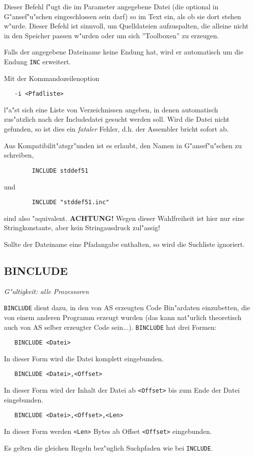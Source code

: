 \documentclass[12pt,a4paper,twoside]{report}
\makeatletter
\newcommand{\ii}[1]{{\it #1}}
\newcommand{\bb}[1]{{\bf #1}}
\newcommand{\tty}[1]{{\tt #1}}
\newcommand{\ttindex}[1]{\index{#1@{\tt #1}}}
\makeatother
\begin{document}
Dieser Befehl f"ugt die im Parameter angegebene Datei (die optional in
G"an\-se\-f"u"s\-chen eingeschlossen sein darf) so im Text ein, als ob sie dort
stehen w"urde.  Dieser Befehl ist sinnvoll, um Quelldateien aufzuspalten,
die alleine nicht in den Speicher passen w"urden oder um sich ''Toolboxen''
zu erzeugen.
\par
Falls der angegebene Dateiname keine Endung hat, wird er automatisch
um die Endung \tty{INC} erweitert.
\par
Mit der Kommandozeilenoption
\begin{verbatim}
   -i <Pfadliste>
\end{verbatim}
l"a"st sich eine Liste von Verzeichnissen angeben, in denen automatisch
zus"atzlich nach der Includedatei gesucht werden soll.  Wird die Datei
nicht gefunden, so ist dies ein \ii{fataler} Fehler, d.h. der Assembler
bricht sofort ab.
\par
Aus Kompatibilit"atsgr"unden ist es erlaubt, den Namen in G"ansef"u"schen
zu schreiben,
\begin{verbatim}
        INCLUDE stddef51
\end{verbatim}
und
\begin{verbatim}
        INCLUDE "stddef51.inc"
\end{verbatim}
sind also "aquivalent.  \bb{ACHTUNG!} Wegen dieser Wahlfreiheit ist
hier nur eine Stringkonstante, aber kein Stringausdruck zul"assig!
\par
Sollte der Dateiname eine Pfadangabe enthalten, so wird die Suchliste
ignoriert.


\subsection{BINCLUDE}
\ttindex{BINCLUDE}

{\em G"ultigkeit: alle Prozessoren}

\tty{BINCLUDE} dient dazu, in den von AS erzeugten Code Bin"ardaten
einzubetten, die von einem anderen Programm erzeugt wurden (das kann
nat"urlich theoretisch auch von AS selber erzeugter Code sein...).
\tty{BINCLUDE} hat drei Formen:
\begin{verbatim}
   BINCLUDE <Datei>
\end{verbatim}
In dieser Form wird die Datei komplett eingebunden.
\begin{verbatim}
   BINCLUDE <Datei>,<Offset>
\end{verbatim}
In dieser Form wird der Inhalt der Datei ab \verb!<Offset>! bis zum Ende
der Datei eingebunden.
\begin{verbatim}
   BINCLUDE <Datei>,<Offset>,<Len>
\end{verbatim}
In dieser Form werden \verb!<Len>! Bytes ab Offset \verb!<Offset>! eingebunden.
\par
Es gelten die gleichen Regeln bez"uglich Suchpfaden wie bei \tty{INCLUDE}.
\end{document}
